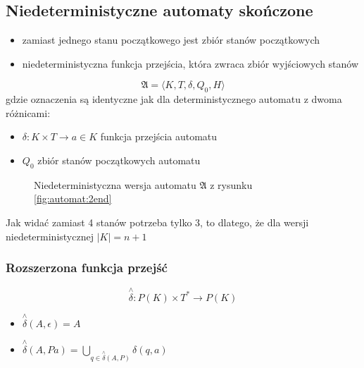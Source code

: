 \documentclass{../notatki}
\begin{document}
\subsection{Niedeterministyczne automaty skończone}

\begin{itemize}
  \item zamiast jednego stanu początkowego jest zbiór stanów początkowych
  \item niedeterministyczna funkcja przejścia, która zwraca zbiór
    wyjściowych stanów
\end{itemize}

$$
\mathfrak{A} = \langle K,T,\delta,Q_0,H \rangle
$$
gdzie oznaczenia są identyczne jak dla deterministycznego automatu z
dwoma różnicami:

\begin{itemize}
  \item $\delta: K \times T \rightarrow a \in K$  funkcja przejścia automatu
  \item $Q_0$ zbiór stanów początkowych automatu
\end{itemize}

\begin{figure}[H]
  \centering
  \caption{Niedeterministyczna wersja automatu $\mathfrak{A}$ z
  rysunku \ref{fig:automat:2end}}
  \label{fig:automat:2end-ndet}
\end{figure}

Jak widać zamiast 4 stanów potrzeba tylko 3, to dlatego, że dla
wersji niedeterministycznej $|K| = n + 1$

\subsubsection{Rozszerzona funkcja przejść}

$$
\stackrel{\wedge}{\delta}: P(K) \times T^* \rightarrow P(K)
$$

\begin{itemize}
  \item $\stackrel{\wedge}{\delta}(A, \epsilon) = A$
  \item $\stackrel{\wedge}{\delta}(A, Pa) = \bigcup_{q \in
    \stackrel{\wedge}{\delta}(A, P)}\delta(q, a)$
\end{itemize}
\end{document}
